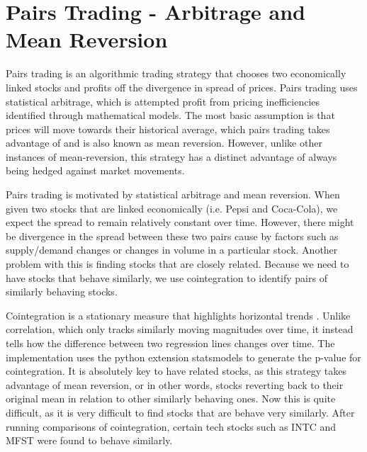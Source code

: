 \documentclass[letterpaper,11pt]{article}
\begin{document}
\section{Pairs Trading - Arbitrage and Mean Reversion}

Pairs trading is an algorithmic trading strategy that chooses two economically linked stocks and profits off the divergence in spread of prices. Pairs trading uses statistical arbitrage, which is attempted profit from pricing inefficiencies identified through mathematical models. The most basic assumption is that prices will move towards their historical average, which pairs trading takes advantage of and is also known as mean reversion.  However, unlike other instances of mean-reversion, this strategy has a distinct advantage of always being hedged against market movements. 

Pairs trading is motivated by statistical arbitrage and mean reversion\cite{Fu2009}. When given two stocks that are linked economically (i.e. Pepsi and Coca-Cola), we expect the spread to remain relatively constant over time. However, there might be divergence in the spread between these two pairs cause by factors such as supply/demand changes or changes in volume in a particular stock.  Another problem with this is finding stocks that are closely related. Because we need to have stocks that behave similarly, we use cointegration to identify pairs of similarly behaving stocks. 

Cointegration is a stationary measure that highlights horizontal trends \cite{Gatev2006}. Unlike correlation, which only tracks similarly moving magnitudes over time, it instead tells how the difference between two regression lines changes over time. The implementation uses the python extension statsmodels to generate the p-value for cointegration. It is absolutely key to have related stocks, as this strategy takes advantage of mean reversion, or in other words, stocks reverting back to their original mean in relation to other similarly behaving ones. Now this is quite difficult, as it is very difficult to find stocks that are behave very similarly. After running comparisons of cointegration, certain tech stocks such as INTC and MFST were found to behave similarly.  
\end{document}
